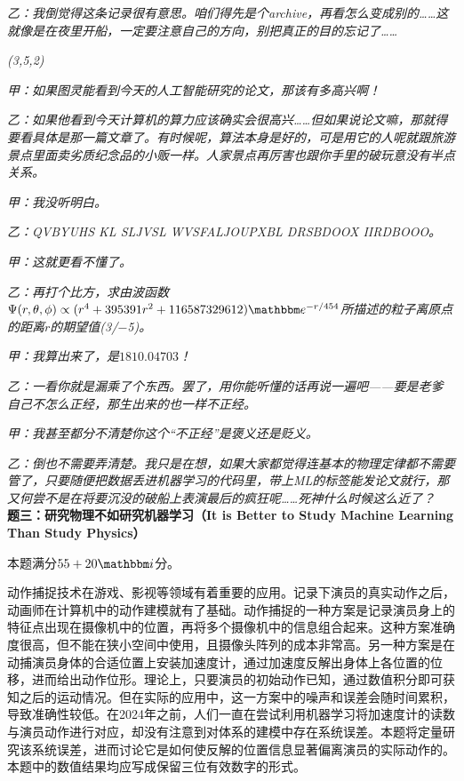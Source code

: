 \documentclass[11pt,a4paper,onecolumn,UTF8]{ctexart}
\begin{document}
	\textit{乙：我倒觉得这条记录很有意思。咱们得先是个archive，再看怎么变成别的……这就像是在夜里开船，一定要注意自己的方向，别把真正的目的忘记了……}
	
	\textit{(3,5,2)}
	
	\textit{甲：如果图灵能看到今天的人工智能研究的论文，那该有多高兴啊！}
	
	\textit{乙：如果他看到今天计算机的算力应该确实会很高兴……但如果说论文嘛，那就得要看具体是那一篇文章了。有时候呢，算法本身是好的，可是用它的人呢就跟旅游景点里面卖劣质纪念品的小贩一样。人家景点再厉害也跟你手里的破玩意没有半点关系。}
	
	\textit{甲：我没听明白。}
	
	\textit{乙：QVBYUHS KL SLJVSL WVSFALJOUPXBL DRSBDOOX IIRDBOOO。}
	
	\textit{甲：这就更看不懂了。}
	
	\textit{乙：再打个比方，求由波函数$\Psi(r,\theta,\phi)\propto(r^4+395391r^2+116587329612)\ue^{-r/454}$所描述的粒子离原点的距离$r$的期望值(3/$-$5)。}
	
	\textit{甲：我算出来了，是$1810.04703$！}
	
	\textit{乙：一看你就是漏乘了个东西。罢了，用你能听懂的话再说一遍吧——要是老爹自己不怎么正经，那生出来的也一样不正经。}
	
	\textit{甲：我甚至都分不清楚你这个“不正经”是褒义还是贬义。}
	
	\textit{乙：倒也不需要弄清楚。我只是在想，如果大家都觉得连基本的物理定律都不需要管了，只要随便把数据丢进机器学习的代码里，带上ML的标签能发论文就行，那又何尝不是在将要沉没的破船上表演最后的疯狂呢……死神什么时候这么近了？}\\
	
	\noindent
	\textbf{题三：研究物理不如研究机器学习（It is Better to Study Machine Learning Than Study Physics）}
	
	本题满分$55+20\ui$分。
	
	动作捕捉技术在游戏、影视等领域有着重要的应用。记录下演员的真实动作之后，动画师在计算机中的动作建模就有了基础。动作捕捉的一种方案是记录演员身上的特征点出现在摄像机中的位置，再将多个摄像机中的信息组合起来。这种方案准确度很高，但不能在狭小空间中使用，且摄像头阵列的成本非常高。另一种方案是在动捕演员身体的合适位置上安装加速度计，通过加速度反解出身体上各位置的位移，进而给出动作位形。理论上，只要演员的初始动作已知，通过数值积分即可获知之后的运动情况。但在实际的应用中，这一方案中的噪声和误差会随时间累积，导致准确性较低。在2024年之前，人们一直在尝试利用机器学习将加速度计的读数与演员动作进行对应，却没有注意到对体系的建模中存在系统误差。本题将定量研究该系统误差，进而讨论它是如何使反解的位置信息显著偏离演员的实际动作的。本题中的数值结果均应写成保留三位有效数字的形式。
	
\end{document}

